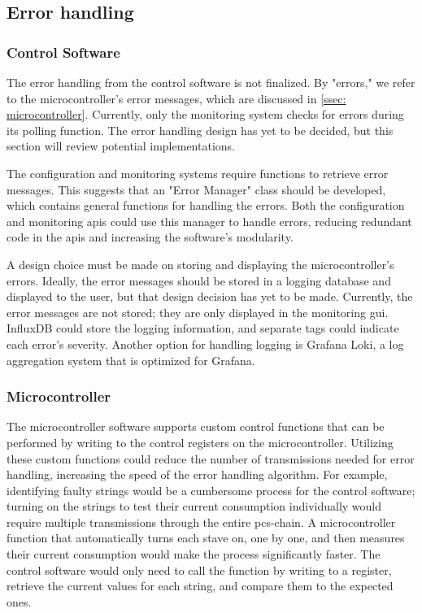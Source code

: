 \documentclass[main.tex]{subfiles}
\begin{document}
\subsection{Error handling}

\subsubsection{Control Software}

The error handling from the control software is not finalized. By "errors," we refer to the microcontroller's error messages, which are discussed in \autoref{ssec: microcontroller}. Currently, only the monitoring system checks for errors during its polling function. The error handling design has yet to be decided, but this section will review potential implementations.

The configuration and monitoring systems require functions to retrieve error messages. This suggests that an "Error Manager" class should be developed, which contains general functions for handling the errors. Both the configuration and monitoring \gls{api}s could use this manager to handle errors, reducing redundant code in the \gls{api}s and increasing the software's modularity.

A design choice must be made on storing and displaying the microcontroller's errors. Ideally, the error messages should be stored in a logging database and displayed to the user, but that design decision has yet to be made. Currently, the error messages are not stored; they are only displayed in the monitoring \gls{gui}. InfluxDB could store the logging information, and separate tags could indicate each error's severity. Another option for handling logging is Grafana Loki, a log aggregation system that is optimized for Grafana. 

\subsubsection{Microcontroller}
The microcontroller software supports custom control functions that can be performed by writing to the control registers on the microcontroller. Utilizing these custom functions could reduce the number of transmissions needed for error handling, increasing the speed of the error handling algorithm. For example, identifying faulty strings would be a cumbersome process for the control software; turning on the strings to test their current consumption individually would require multiple transmissions through the entire \gls{pcs}-chain. A microcontroller function that automatically turns each stave on, one by one, and then measures their current consumption would make the process significantly faster. The control software would only need to call the function by writing to a register, retrieve the current values for each string, and compare them to the expected ones.
\end{document}
